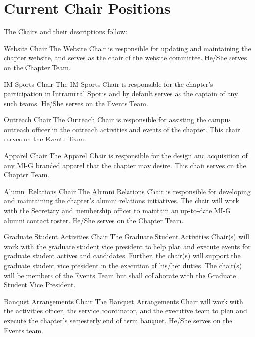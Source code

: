 \section{Current Chair Positions} The Chairs and their descriptions follow:\\
\begin{enumsubsection}
\item{Website Chair} The Website Chair is responsible for updating and maintaining the chapter website, and serves as the chair of the website committee. He/She serves on the Chapter Team.
\item{IM Sports Chair} The IM Sports Chair is responsible for the chapter's participation in Intramural Sports and by default serves as the captain of any such teams. He/She serves on the Events Team.
\item{Outreach Chair} The Outreach Chair is responsible for assisting the
campus outreach officer in the outreach activities and events of the chapter. This chair serves on the Events Team.
\item{Apparel Chair} The Apparel Chair is responsible for the design and acquisition of any MI-G branded apparel that the chapter may desire. This chair serves on the Chapter Team.
\item{Alumni Relations Chair} The Alumni Relations Chair is responsible for developing and maintaining the chapter's alumni relations initiatives. The chair will work with the Secretary and membership officer to maintain an up-to-date MI-G alumni contact roster. He/She serves on the Chapter Team.
\item{Graduate Student Activities Chair} The Graduate Student Activities Chair(s) will work with the graduate student vice president to help plan and execute events for graduate student actives and candidates. Further, the chair(s) will support the graduate student vice president in the execution of his/her duties. The chair(s) will be members of the Events Team but shall collaborate with the Graduate Student Vice President.

\item{Banquet Arrangements Chair} The Banquet Arrangements Chair will work with the activities officer, the  service coordinator, and the executive team to plan and execute the chapter's semesterly end of term banquet. He/She serves on the Events team.


\end{enumsubsection}
